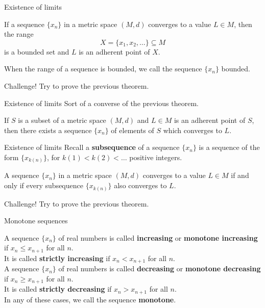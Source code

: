 \documentclass{beamer}
\begin{document}
\begin{frame}{Existence of limits}
\begin{thm}
If a sequence $\{x_n\}$ in a metric space $(M,d)$ converges to a value $L\in M$, then the range
$$X = \{x_1,x_2,\dots\}\subseteq M$$
is a bounded set and $L$ is an adherent point of $X$.
\end{thm}
\pause
When the range of a sequence is bounded, we call the sequence $\{x_n\}$ bounded.
\end{frame}

\begin{frame}{Challenge!}
Try to prove the previous theorem.
\end{frame}

\begin{frame}{Existence of limits}
Sort of a converse of the previous theorem.
\pause
\begin{thm}
If $S$ is a subset of a metric space $(M,d)$ and $L\in M$ is an adherent point of $S$, then there exists a sequence $\{x_n\}$ of elements of $S$ which converges to $L$.
\end{thm}
\end{frame}

\begin{frame}{Existence of limits}
Recall a \textbf{subsequence} of a sequence $\{x_n\}$ is a sequence of the form $\{x_{k(n)}\}$, for $k(1) < k(2) < \dots$ positive integers.
\pause
\begin{thm}
A sequence $\{x_n\}$ in a metric space $(M,d)$ converges to a value $L\in M$ if and only if every subsequence $\{x_{k(n)}\}$ also converges to $L$.
\end{thm}
\end{frame}

\begin{frame}{Challenge!}
Try to prove the previous theorem.
\end{frame}

\begin{frame}{Monotone sequences}
\begin{defn}
\pause
A sequence $\{x_n\}$ of real numbers is called \textbf{increasing} or \textbf{monotone increasing} if $x_n\leq x_{n+1}$ for all $n$.\\
\pause
It is called \textbf{strictly increasing} if $x_n < x_{n+1}$ for all $n$.\\
\pause
A sequence $\{x_n\}$ of real numbers is called \textbf{decreasing} or \textbf{monotone decreasing} if $x_n\geq x_{n+1}$ for all $n$.\\
\pause
It is called \textbf{strictly decreasing} if $x_n > x_{n+1}$ for all $n$.\\
\pause
In any of these cases, we call the sequence \textbf{monotone}.
\end{defn}
\end{frame}
\end{document}
